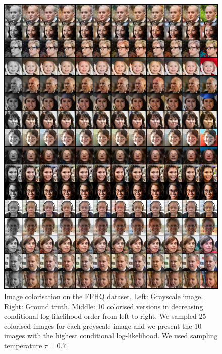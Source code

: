 \begin{figure}[h!]
    \centering
    \includegraphics[width=\textwidth]{Chapter1/paper_graphs/SupplementaryMaterial/colorization_ffhq_T_0.7_0.png}
    \caption{Image colorisation on the FFHQ dataset. Left: Grayscale image. Right: Ground truth. Middle: 10 colorised versions in decreasing conditional log-likelihood order from left to right. We sampled 25 colorised images for each greyscale image and we present the 10 images with the highest conditional log-likelihood. We used sampling temperature $\tau=0.7$.}
\end{figure}

